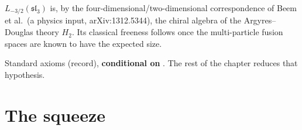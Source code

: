 \begin{physics}
$L_{-3/2}(\mathfrak{sl}_3)$ is, by the four-dimensional/two-dimensional correspondence of Beem et al.\ (a physics input,
arXiv:1312.5344), the chiral algebra of the Argyres--Douglas theory $H_2$. Its classical freeness follows once the multi-particle
fusion spaces are known to have the expected size.
\end{physics}

\begin{status}
Standard axioms (record), \textbf{conditional on} . The rest of
the chapter reduces that hypothesis.
\end{status}

\section{The squeeze}\label{l26:sec:squeeze}

